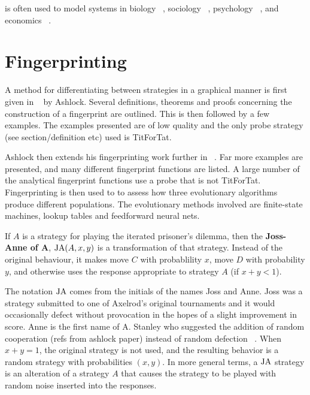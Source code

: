 is often used to model systems in biology ~\cite{Sigmund1999}, sociology ~\cite{Franken2005},
psychology ~\cite{Ishibuchi2005}, and economics ~\cite{Chong2005}.


\section{Fingerprinting}\label{sec:fingerprinting}

A method for differentiating between strategies in a graphical manner is first given in ~\cite{Ashlock2004} by Ashlock.
Several definitions, theorems and proofs concerning the construction of a fingerprint are outlined.
This is then followed by a few examples.
The examples presented are of low quality and the only probe strategy (see section/definition etc) used is TitForTat.

Ashlock then extends his fingerprinting work further in ~\cite{Ashlock2008}.
Far more examples are presented, and many different fingerprint functions are listed.
A large number of the analytical fingerprint functions use a probe that is not TitForTat.
Fingerprinting is then used to to assess how three evolutionary algorithms produce different populations.
The evolutionary methods involved are finite-state machines, lookup tables and feedforward neural nets.


\begin{definition}\label{def:joss-ann}
If $A$ is a strategy for playing the iterated prisoner's dilemma, then the \textbf{Joss-Anne of A}, $\text{JA}(A, x, y)$ is a transformation of that strategy.
Instead of the original behaviour, it makes move $C$ with probablility $x$, move $D$ with probability $y$, and otherwise uses the response appropriate to strategy $A$ (if $x+y < 1$).
\end{definition}

The notation $\text{JA}$ comes from the initials of the names Joss and Anne.
Joss was a strategy submitted to one of Axelrod’s original tournaments and it would occasionally defect without provocation in the hopes of a slight improvement in score.
Anne is the first name of A. Stanley who suggested the addition of random cooperation (refs from ashlock paper) instead of random defection ~\cite{Ashlock2008}.
When $x + y = 1$, the original strategy is not used, and the resulting behavior is a random strategy with probabilities $(x, y)$.
In more general terms, a $\text{JA}$ strategy is an alteration of a strategy $A$ that causes the strategy to be played with random noise inserted into the responses.

